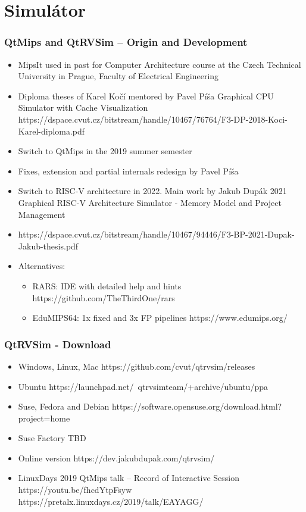 \documentclass{beamer}
\subtitle{Lekce 04. Central Processing Unit (CPU)}
\author{Pavel Píša\\ \small\texttt{pisa@fel.cvut.cz}}
\begin{document}
\maketitle

\section{Simulátor}

\begin{frame}
\frametitle{QtMips and QtRVSim – Origin and Development}

\begin{itemize}
\item MipsIt used in past for Computer Architecture course at the Czech Technical University in Prague, Faculty of Electrical Engineering
\item Diploma theses of Karel Kočí mentored by Pavel Píša
Graphical CPU Simulator with Cache Visualization
https://dspace.cvut.cz/bitstream/handle/10467/76764/F3-DP-2018-Koci-Karel-diploma.pdf
\item Switch to QtMips in the 2019 summer semester
\item Fixes, extension and partial internals redesign by Pavel Píša
\item Switch to RISC-V architecture in 2022. Main work by Jakub Dupák 2021
Graphical RISC-V Architecture Simulator - Memory Model and Project Management
\item https://dspace.cvut.cz/bitstream/handle/10467/94446/F3-BP-2021-Dupak-Jakub-thesis.pdf

\item Alternatives:
\begin{itemize}
 \item RARS: IDE with detailed help and hints
 https://github.com/TheThirdOne/rars
 \item EduMIPS64: 1x fixed and 3x FP pipelines
 https://www.edumips.org/
\end{itemize}
\end{itemize}

\end{frame}


\begin{frame}
\frametitle{QtRVSim - Download}
\begin{itemize}
\item Windows, Linux, Mac
https://github.com/cvut/qtrvsim/releases
\item  Ubuntu
https://launchpad.net/~qtrvsimteam/+archive/ubuntu/ppa
\item Suse, Fedora and Debian
https://software.opensuse.org/download.html?project=home%
\item Suse Factory
TBD
\item Online version
https://dev.jakubdupak.com/qtrvsim/
\item LinuxDays 2019 QtMips talk – Record of Interactive Session
https://youtu.be/fhcdYtpFsyw
https://pretalx.linuxdays.cz/2019/talk/EAYAGG/
\end{itemize}
\end{frame}
\end{document}
